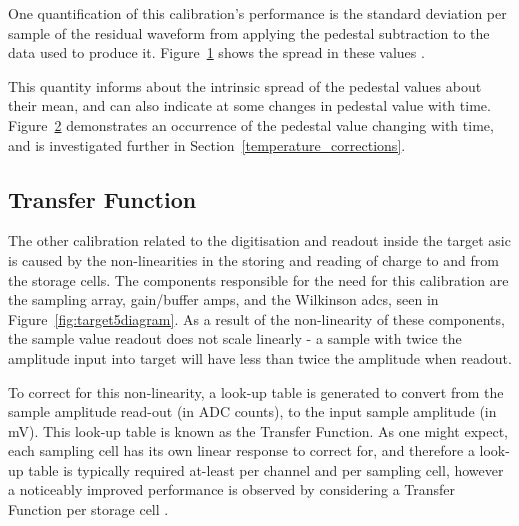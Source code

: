 \begin{figure}
	\caption[Spread of sample values from the residual waveforms resulting from applying the waveforms to the data used to produce them.]{} 
	\label{fig:pedestalresiduals}
\end{figure}

\begin{figure}
	\caption[Same as \ref{fig:pedestalresiduals}, but split into increments of 10,000 events.]{} 
	\label{fig:pedestalresidualssplit}
\end{figure}

One quantification of this calibration's performance is the standard deviation per sample of the residual waveform from applying the pedestal subtraction to the data used to produce it. Figure~\ref{fig:pedestalresiduals} shows the spread in these values . 

This quantity informs about the intrinsic spread of the pedestal values about their mean, and can also indicate at some changes in pedestal value with time. Figure~\ref{fig:pedestalresidualssplit} demonstrates an occurrence of the pedestal value changing with time, and is investigated further in Section~\ref{temperature_corrections}.

\subsection{Transfer Function}

The other calibration related to the digitisation and readout inside the \gls{target} \gls{asic} is caused by the non-linearities in the storing and reading of charge to and from the storage cells. The components responsible for the need for this calibration are the sampling array, gain/buffer amps, and the Wilkinson \glspl{adc}, seen in Figure~\ref{fig:target5diagram}. As a result of the non-linearity of these components, the sample value readout does not scale linearly - a sample with twice the amplitude input into \gls{target} will have less than twice the amplitude when readout.

To correct for this non-linearity, a look-up table is generated to convert from the sample amplitude read-out (in ADC counts), to the input sample amplitude (in mV). This look-up table is known as the Transfer Function. As one might expect, each sampling cell has its own linear response to correct for, and therefore a look-up table is typically required at-least per channel and per sampling cell, however a noticeably improved performance is observed by considering a Transfer Function per storage cell .

